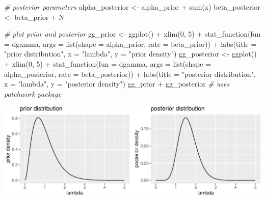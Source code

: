 \documentclass[
]{book}
\newenvironment{Shaded}{\begin{snugshade}}{\end{snugshade}}
\newcommand{\AttributeTok}[1]{\textcolor[rgb]{0.77,0.63,0.00}{#1}}
\newcommand{\CommentTok}[1]{\textcolor[rgb]{0.56,0.35,0.01}{\textit{#1}}}
\newcommand{\DecValTok}[1]{\textcolor[rgb]{0.00,0.00,0.81}{#1}}
\newcommand{\FunctionTok}[1]{\textcolor[rgb]{0.00,0.00,0.00}{#1}}
\newcommand{\NormalTok}[1]{#1}
\newcommand{\OtherTok}[1]{\textcolor[rgb]{0.56,0.35,0.01}{#1}}
\newcommand{\SpecialCharTok}[1]{\textcolor[rgb]{0.00,0.00,0.00}{#1}}
\newcommand{\StringTok}[1]{\textcolor[rgb]{0.31,0.60,0.02}{#1}}
\begin{document}
\begin{Shaded}
\begin{Highlighting}[]
\CommentTok{\# posterior parameters}
\NormalTok{alpha\_posterior }\OtherTok{\textless{}{-}}\NormalTok{ alpha\_prior }\SpecialCharTok{+} \FunctionTok{sum}\NormalTok{(x)}
\NormalTok{beta\_posterior }\OtherTok{\textless{}{-}}\NormalTok{ beta\_prior }\SpecialCharTok{+}\NormalTok{ N}

\CommentTok{\# plot prior and posterior}
\NormalTok{gg\_prior }\OtherTok{\textless{}{-}} \FunctionTok{ggplot}\NormalTok{() }\SpecialCharTok{+} \FunctionTok{xlim}\NormalTok{(}\DecValTok{0}\NormalTok{, }\DecValTok{5}\NormalTok{) }\SpecialCharTok{+} 
  \FunctionTok{stat\_function}\NormalTok{(}\AttributeTok{fun =}\NormalTok{ dgamma, }\AttributeTok{args =} \FunctionTok{list}\NormalTok{(}\AttributeTok{shape =}\NormalTok{ alpha\_prior, }\AttributeTok{rate =}\NormalTok{ beta\_prior)) }\SpecialCharTok{+} 
  \FunctionTok{labs}\NormalTok{(}\AttributeTok{title =} \StringTok{"prior distribution"}\NormalTok{, }\AttributeTok{x =} \StringTok{"lambda"}\NormalTok{, }\AttributeTok{y =} \StringTok{"prior density"}\NormalTok{)}
\NormalTok{gg\_posterior }\OtherTok{\textless{}{-}} \FunctionTok{ggplot}\NormalTok{() }\SpecialCharTok{+} \FunctionTok{xlim}\NormalTok{(}\DecValTok{0}\NormalTok{, }\DecValTok{5}\NormalTok{) }\SpecialCharTok{+} 
  \FunctionTok{stat\_function}\NormalTok{(}\AttributeTok{fun =}\NormalTok{ dgamma, }\AttributeTok{args =} \FunctionTok{list}\NormalTok{(}\AttributeTok{shape =}\NormalTok{ alpha\_posterior, }\AttributeTok{rate =}\NormalTok{ beta\_posterior)) }\SpecialCharTok{+} 
  \FunctionTok{labs}\NormalTok{(}\AttributeTok{title =} \StringTok{"posterior distribution"}\NormalTok{, }\AttributeTok{x =} \StringTok{"lambda"}\NormalTok{, }\AttributeTok{y =} \StringTok{"posterior density"}\NormalTok{)}
\NormalTok{gg\_prior }\SpecialCharTok{+}\NormalTok{ gg\_posterior  }\CommentTok{\# uses patchwork package}
\end{Highlighting}
\end{Shaded}

\includegraphics{02-01-bayes_files/figure-latex/unnamed-chunk-7-1.pdf}
\end{document}
